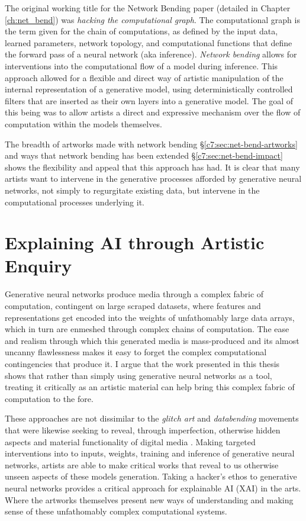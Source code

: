 The original working title for the Network Bending paper (detailed in Chapter \ref{ch:net_bend}) was \textit{hacking the computational graph}.
The computational graph is the term given for the chain of computations, as defined by the input data, learned parameters, network topology, and computational functions that define the forward pass of a neural network (aka inference). \textit{Network bending} allows for interventions into the computational flow of a model during inference. 
This approach allowed for a flexible and direct way of artistic manipulation of the internal representation of a generative model, using deterministically controlled filters that are inserted as their own layers into a generative model.
The goal of this being was to allow artists a direct and expressive mechanism over the flow of computation within the models themselves.

The breadth of artworks made with network bending \S \ref{c7:sec:net-bend-artworks} and ways that network bending has been extended \S \ref{c7:sec:net-bend-impact} shows the flexibility and appeal that this approach has had.
It is clear that many artists want to intervene in the generative processes afforded by generative neural networks, not simply to regurgitate existing data, but intervene in the computational processes underlying it.

\section{Explaining AI through Artistic Enquiry}
\label{c8:sec:explaining}

Generative neural networks produce media through a complex fabric of computation, contingent on large scraped datasets, where features and representations get encoded into the weights of unfathomably large data arrays, which in turn are enmeshed through complex chains of computation. 
The ease and realism through which this generated media is mass-produced and its almost uncanny flawlessness \cite{smith2023ai} makes it easy to forget the complex computational contingencies that produce it. 
I argue that the work presented in this thesis shows that rather than simply using generative neural networks as a tool, treating it critically as an artistic material can help bring this complex fabric of computation to the fore. 

These approaches are not dissimilar to the \textit{glitch art} and \textit{databending} movements that were likewise seeking to reveal, through imperfection, otherwise hidden aspects and material functionality of digital media \cite{kemper2023glitch}.
Making targeted interventions into to inputs, weights, training and inference of generative neural networks, artists are able to make critical works that reveal to us otherwise unseen aspects of these models generation. 
Taking a hacker's ethos to generative neural networks provides a critical approach for explainable AI (XAI) in the arts.
Where the artworks themselves present new ways of understanding and making sense of these unfathomably complex computational systems. 

